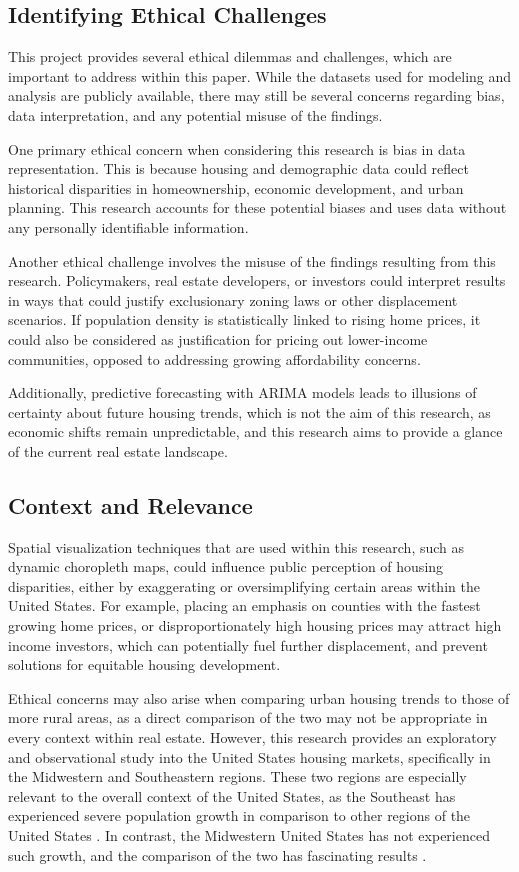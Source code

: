 \documentclass[journal,article,submit,pdftex,moreauthors]{Definitions/mdpi}
\begin{document}
\subsection{Identifying Ethical Challenges}

This project provides several ethical dilemmas and challenges, which are important to address within this paper. While the datasets used for modeling and analysis are publicly available, there may still be several concerns regarding bias, data interpretation, and any potential misuse of the findings.

One primary ethical concern when considering this research is bias in data representation. This is because housing and demographic data could reflect historical disparities in homeownership, economic development, and urban planning. This research accounts for these potential biases and uses data without any personally identifiable information.

Another ethical challenge involves the misuse of the findings resulting from this research. Policymakers, real estate developers, or investors could interpret results in ways that could justify exclusionary zoning laws or other displacement scenarios. If population density is statistically linked to rising home prices, it could also be considered as justification for pricing out lower-income communities, opposed to addressing growing affordability concerns.

Additionally, predictive forecasting with ARIMA models leads to illusions of certainty about future housing trends, which is not the aim of this research, as economic shifts remain unpredictable, and this research aims to provide a glance of the current real estate landscape.

\subsection{Context and Relevance}

Spatial visualization techniques that are used within this research, such as dynamic choropleth maps, could influence public perception of housing disparities, either by exaggerating or oversimplifying certain areas within the United States. For example, placing an emphasis on counties with the fastest growing home prices, or disproportionately high housing prices may attract high income investors, which can potentially fuel further displacement, and prevent solutions for equitable housing development.

Ethical concerns may also arise when comparing urban housing trends to those of more rural areas, as a direct comparison of the two may not be appropriate in every context within real estate. However, this research provides an exploratory and observational study into the United States housing markets, specifically in the Midwestern and Southeastern regions. These two regions are especially relevant to the overall context of the United States, as the Southeast has experienced severe population growth in comparison to other regions of the United States \citep{biernackalievestro_2023_southern}. In contrast, the Midwestern United States has not experienced such growth, and the comparison of the two has fascinating results \citep{maynard_2021_population}.
\end{document}

